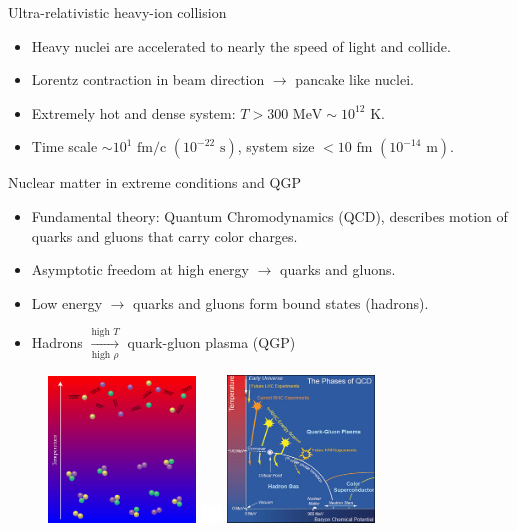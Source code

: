 \documentclass[11pt]{beamer}
\begin{document}
\begin{frame}{Ultra-relativistic heavy-ion collision}
\begin{itemize}
\item Heavy nuclei are accelerated to nearly the speed of light and collide.
\item Lorentz contraction in beam direction $\rightarrow$ pancake like nuclei.
\item Extremely hot and dense system: $T > 300 \textrm{ MeV} \sim 10^{12} \textrm{ K}$. 
\item Time scale $\sim 10^1 \textrm{ fm/c } (10^{-22} \textrm{ s})$, system size $< 10 \textrm{ fm } (10^{-14}\textrm{ m})$.
\end{itemize}
\end{frame}

\begin{frame}{Nuclear matter in extreme conditions and QGP}
\begin{itemize}
\item Fundamental theory: Quantum Chromodynamics (QCD), describes motion of {\color{red}quarks} and {\color{red}gluons} that carry color charges.
\item Asymptotic freedom at high energy $\rightarrow$ quarks and gluons.
\item Low energy $\rightarrow$ quarks and gluons form bound states (hadrons).
\item Hadrons	$\xrightarrow[\textrm{high } \rho]{\textrm{high } T}$ quark-gluon plasma (QGP)
\end{itemize}

    \begin{figure}
   	\begin{center}
	\includegraphics[width=0.35\textwidth]{pics/deconfine.png} 
	\includegraphics[width=0.05\textwidth]{pics/place_holder.png}
	\includegraphics[width=0.35\textwidth]{pics/phase_diagram.jpg} 
	\end{center} 	
  	\end{figure}

\end{frame}
\end{document}
